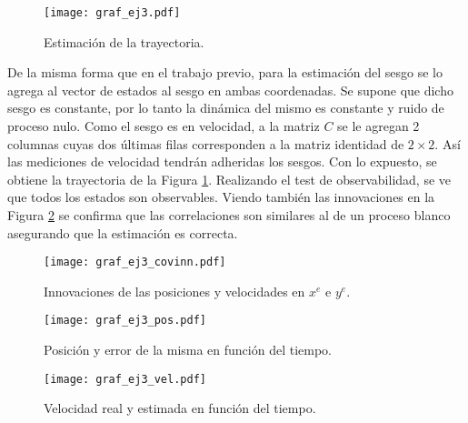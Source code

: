 

\begin{figure}[H]
\centering
\texttt{[image: graf\_ej3.pdf]}
\caption{Estimación de la trayectoria.}
\label{fig:ej3} 
\end{figure}

	De la misma forma que en el trabajo previo, para la estimación del sesgo se lo agrega al vector de estados al sesgo en ambas coordenadas. Se supone que dicho sesgo es constante, por lo tanto la dinámica del mismo es constante y ruido de proceso nulo. Como el sesgo es en velocidad, a la matriz $C$ se le agregan 2 columnas cuyas dos últimas filas corresponden a la matriz identidad de $2\times 2$. Así las mediciones de velocidad tendrán adheridas los sesgos. Con lo expuesto, se obtiene la trayectoria de la Figura \ref{fig:ej3}. Realizando el test de observabilidad, se ve que todos los estados son observables. Viendo también las innovaciones en la Figura \ref{fig:3covinn} se confirma que las correlaciones son similares al de un proceso blanco asegurando que la estimación es correcta.\\ 


\begin{figure}[H]
\centering
\texttt{[image: graf\_ej3\_covinn.pdf]}
\caption{Innovaciones de las posiciones y velocidades en $x^e$ e $y^e$.}
\label{fig:3covinn} 
\end{figure}

\pagebreak



\vspace*{\fill}
\begin{figure}[H]
\centering
\texttt{[image: graf\_ej3\_pos.pdf]}
\caption{Posición y error de la misma en función del tiempo.}
\label{fig:3pos} 
\end{figure}
\vspace*{\fill}

\pagebreak



\vspace*{\fill}
\begin{figure}[H]
\centering
\texttt{[image: graf\_ej3\_vel.pdf]}
\caption{Velocidad real y estimada en función del tiempo.}
\label{fig:3vel} 
\end{figure}
\vspace*{\fill}

\pagebreak

\vspace*{\fill}
\vspace*{\fill}